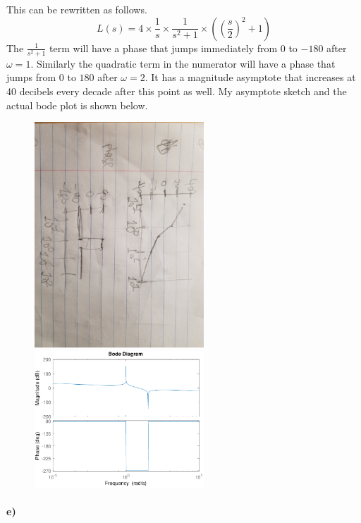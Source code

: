 \documentclass[12pt]{article}
\begin{document}
This can be rewritten as follows.
\[L(s)=4\times\frac{1}{s}\times\frac{1}{s^2+1}\times\left(\left(\frac{s}{2}\right)^2+1\right)\]
The \(\frac{1}{s^2+1}\) term will have a phase that jumps immediately from 0 to \(-180\) after \(\omega=1\). Similarly
the quadratic term in the numerator will have a phase that jumps from 0 to \(180\) after \(\omega=2\). It has a magnitude asymptote
that increases at 40 decibels every decade after this point as well.
My asymptote sketch and the actual bode plot is shown below.
\begin{figure}[H]
    \begin{center}
        \includegraphics[width=2.5in]{problem1d.jpg}
        \includegraphics[width=2.5in]{problem1d.pdf}
    \end{center}
\end{figure}

\paragraph{e)}
\end{document}
